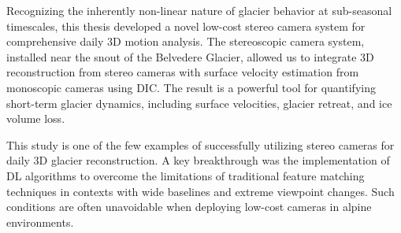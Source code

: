 
Recognizing the inherently non-linear nature of glacier behavior at sub-seasonal timescales, this thesis developed a novel low-cost stereo camera system for comprehensive daily 3D motion analysis.  
The stereoscopic camera system, installed near the snout of the Belvedere Glacier, allowed us to integrate 3D reconstruction from stereo cameras with surface velocity estimation from monoscopic cameras using DIC. 
The result is a powerful tool for quantifying short-term glacier dynamics, including surface velocities, glacier retreat, and ice volume loss.

This study is one of the few examples of successfully utilizing stereo cameras for daily 3D glacier reconstruction. 
A key breakthrough was the implementation of DL algorithms to overcome the limitations of traditional feature matching techniques in contexts with wide baselines and extreme viewpoint changes.  
Such conditions are often unavoidable when deploying low-cost cameras in alpine environments.

